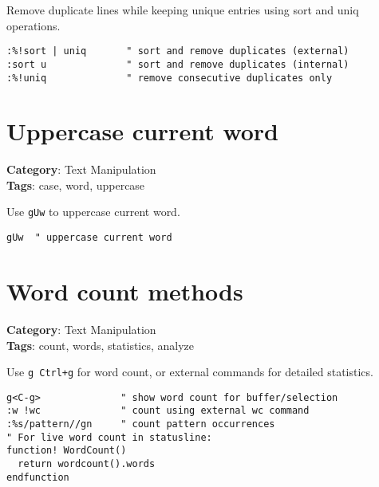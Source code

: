{{{{{{{{{{{{{{Remove duplicate lines while keeping unique entries using sort and uniq operations.

\begin{Exa*}{}
\begin{Verbatim}[fontsize=\footnotesize, breaklines, breakanywhere]
:%!sort | uniq       " sort and remove duplicates (external)
:sort u              " sort and remove duplicates (internal)
:%!uniq              " remove consecutive duplicates only
\end{Verbatim}
\end{Exa*}

\section{Uppercase current word}

\textbf{Category}: Text Manipulation\\ \textbf{Tags}: case, word, uppercase
\vspace{0.5cm}

Use {\footnotesize \Verb§gUw§} to uppercase current word.

\begin{Exa*}{}
\begin{Verbatim}[fontsize=\footnotesize, breaklines, breakanywhere]
gUw  " uppercase current word
\end{Verbatim}
\end{Exa*}

\section{Word count methods}

\textbf{Category}: Text Manipulation\\ \textbf{Tags}: count, words, statistics, analyze
\vspace{0.5cm}

Use {\footnotesize \Verb§g Ctrl+g§} for word count, or external commands for detailed statistics.

\begin{Exa*}{}
\begin{Verbatim}[fontsize=\footnotesize, breaklines, breakanywhere]
g<C-g>              " show word count for buffer/selection
:w !wc              " count using external wc command
:%s/pattern//gn     " count pattern occurrences
" For live word count in statusline:
function! WordCount()
  return wordcount().words
endfunction
\end{Verbatim}
\end{Exa*}

}}}}}}}}}}}}}}
